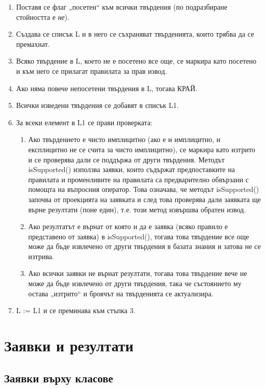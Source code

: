 \documentclass[12pt]{article}
\begin{document}
    \begin{enumerate}
        \item Поставя се флаг „посетен“ към всички твърдения (по подразбиране стойността е \textit{не}).
        \item Създава се списък L и в него се съхраняват твърденията, които трябва да се премахнат.
        \item Всяко твърдение в L, което не е посетено все още, се маркира като посетено и към него се прилагат правилата за прав извод.
        \item Ако няма повече непосетени твърдения в L, тогава КРАЙ.
        \item Всички изведени твърдения се добавят в списък L1.
        \item За всеки елемент в L1 се прави проверката:
            \begin{enumerate}
                \item Ако твърдението е чисто имплицитно (ако е и имплицитно, и експлицитно не се счита за чисто имплицитно), се маркира като изтрито и се проверява дали се поддържа от други твърдения. Методът isSupported() използва заявки, които съдържат предпоставките на правилата и променливите на правилата са предварително обвързани с помощта на въпросния оператор. Това означава, че методът isSupported() започва от проекцията на заявката и след това проверява дали заявката ще върне резултати (поне един), т.е. този метод извършва обратен извод.
                \item Ако резултатът е върнат от която и да е заявка (всяко правило е представено от заявка) в isSupported(), тогава това твърдение все още може да бъде извлечено от други твърдения в базата знания и затова не се изтрива.
                \item Ако всички заявки не върнат резултати, тогава това твърдение вече не може да бъде извлечено от други твърдения, така че състоянието му остава „изтрито“ и броячът на твърденията се актуализира.
            \end{enumerate}
        \item L := L1 и се преминава към стъпка 3.
    \end{enumerate}

\section{Заявки и резултати}

    \subsection{Заявки върху класове}
\end{document}
